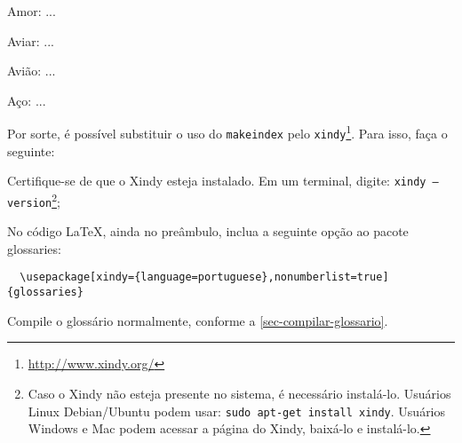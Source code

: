 \documentclass[12pt,openright,twoside,a4paper,brazil]{abntex2}
\begin{document}
\begin{alineas}
 \item Amor: ...
 \item Aviar: ...
 \item Avião: ...
 \item Aço: ...
\end{alineas}

Por sorte, é possível substituir o uso do \texttt{makeindex}
pelo \texttt{xindy}\footnote{\url{http://www.xindy.org/}}. Para isso, faça o
seguinte:

\begin{alineas}
  \item Certifique-se de que o Xindy esteja instalado. Em um terminal, digite:
  \texttt{xindy --version}\footnote{Caso o Xindy não esteja presente no sistema, é necessário
    instalá-lo. Usuários Linux Debian/Ubuntu podem usar: \texttt{sudo
    apt-get install xindy}. Usuários Windows e Mac podem acessar a página do
    Xindy, baixá-lo e instalá-lo.};
  \item No código LaTeX, ainda no preâmbulo, inclua a seguinte opção ao pacote glossaries:
  \begin{verbatim}
  \usepackage[xindy={language=portuguese},nonumberlist=true]{glossaries}
  \end{verbatim}
  \item Compile o glossário normalmente, conforme a
  \autoref{sec-compilar-glossario}.
\end{alineas}



 
 
\postextual
 
 

 

\renewcommand{\glossaryname}{Glossário}
\renewcommand{\glossarypreamble}{Esta é a descrição do glossário. Experimente
visualizar outros estilos de glossários, como o \texttt{altlisthypergroup},
por exemplo.\\
\\}
\end{document}
